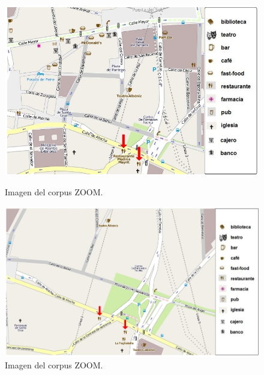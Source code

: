 \begin{figure}
\begin{minipage}[b]{0.48\linewidth}
\centering
\includegraphics[width=\textwidth]{images/corpus/mapa10.png}
\caption{Imagen del corpus ZOOM.}
\label{mapa17}
\end{minipage}
\hspace*{0cm}
\begin{minipage}[b]{0.55\linewidth}
\centering
\includegraphics[width=\textwidth]{images/corpus/mapa20.png}
\caption{Imagen del corpus ZOOM.}
\label{mapa18}
\end{minipage}
\end{figure}

